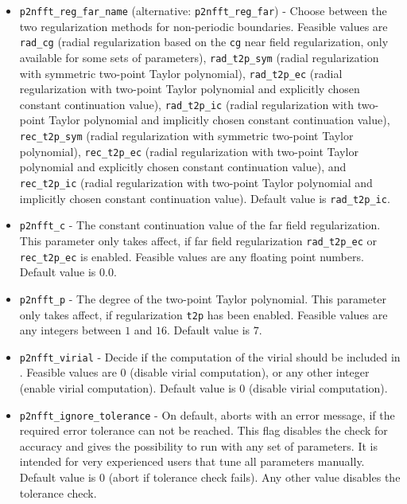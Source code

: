 \begin{itemize}
  \item \verb!p2nfft_reg_far_name! (alternative: \verb!p2nfft_reg_far!) -
    Choose between the two regularization methods for non-periodic boundaries. Feasible values are \verb!rad_cg! (radial regularization based on the \verb!cg! near field regularization, only available for some sets of parameters),
    \verb!rad_t2p_sym! (radial regularization with symmetric two-point Taylor polynomial),
    \verb!rad_t2p_ec!  (radial regularization with two-point Taylor polynomial and explicitly chosen constant continuation value),
    \verb!rad_t2p_ic!  (radial regularization with two-point Taylor polynomial and implicitly chosen constant continuation value),
    \verb!rec_t2p_sym! (radial regularization with symmetric two-point Taylor polynomial),
    \verb!rec_t2p_ec!  (radial regularization with two-point Taylor polynomial and explicitly chosen constant continuation value), and
    \verb!rec_t2p_ic!  (radial regularization with two-point Taylor polynomial and implicitly chosen constant continuation value).
    Default value is \verb!rad_t2p_ic!.
  \item \verb!p2nfft_c! -
    The constant continuation value of the far field regularization. This parameter only takes affect, if far field regularization \verb!rad_t2p_ec! or \verb!rec_t2p_ec! is enabled.
    Feasible values are any floating point numbers. Default value is $0.0$.
  \item \verb!p2nfft_p! -
    The degree of the two-point Taylor polynomial. This parameter only takes affect, if regularization \verb!t2p! has been enabled.
    Feasible values are any integers between $1$ and $16$. Default value is $7$.
  \item \verb!p2nfft_virial! -
    Decide if the computation of the virial should be included in \ptwonfft.
    Feasible values are $0$ (disable virial computation), or any other integer (enable virial computation).
    Default value is $0$ (disable virial computation).
  \item \verb!p2nfft_ignore_tolerance! -
    On default, \ptwonfft aborts with an error message, if the required error tolerance can not be reached.
    This flag disables the check for accuracy and gives the possibility to run \ptwonfft
    with any set of parameters. It is intended for very experienced users that tune all parameters manually.
    Default value is $0$ (abort if tolerance check fails). Any other value disables the tolerance check.
\end{itemize}

